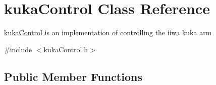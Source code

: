 \hypertarget{classkukaControl}{}\section{kuka\+Control Class Reference}
\label{classkukaControl}


\hyperlink{classkukaControl}{kuka\+Control} is an implementation of controlling the iiwa kuka arm
\begin{DoxyItemize}
\item 
\end{DoxyItemize} 




{\ttfamily \#include $<$kuka\+Control.\+h$>$}

\subsection*{Public Member Functions}
